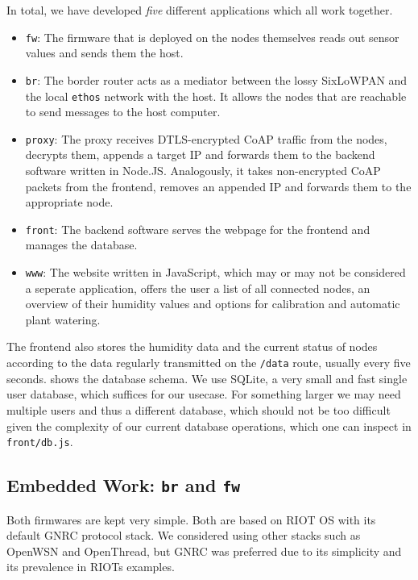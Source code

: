 \documentclass[acmtog, language=english, nonacm]{acmart}
\begin{document}
    In total, we have developed \emph{five} different applications which all work together.
    \begin{itemize}
        \item \texttt{fw}: The firmware that is deployed on the nodes themselves reads out sensor values and sends them the host.
        \item \texttt{br}: The border router acts as a mediator between the lossy SixLoWPAN and the local \texttt{ethos} network with the host. It allows the nodes that are reachable to send messages to the host computer.
        \item \texttt{proxy}: The proxy receives DTLS-encrypted CoAP traffic from the nodes, decrypts them, appends a target IP and forwards them to the backend software written in Node.JS. Analogously, it takes non-encrypted CoAP packets from the frontend, removes an appended IP and forwards them to the appropriate node.
        \item \texttt{front}: The backend software serves the webpage for the frontend and manages the database.
        \item \texttt{www}: The website written in JavaScript, which may or may not be considered a seperate application, offers the user a list of all connected nodes, an overview of their humidity values and options for calibration and automatic plant watering.
    \end{itemize}

    The frontend also stores the humidity data and the current status of nodes according to the data regularly transmitted on the \texttt{/data} route, usually every five seconds.  shows the database schema. We use SQLite, a very small and fast single user database, which suffices for our usecase. For something larger we may need multiple users and thus a different database, which should not be too difficult given the complexity of our current database operations, which one can inspect in \texttt{front/db.js}.

    \subsection{Embedded Work: \texttt{br} and \texttt{fw}}

    Both firmwares are kept very simple. Both are based on RIOT OS with its default GNRC protocol stack. We considered using other stacks such as OpenWSN and OpenThread, but GNRC was preferred due to its simplicity and its prevalence in RIOTs examples.
\end{document}
